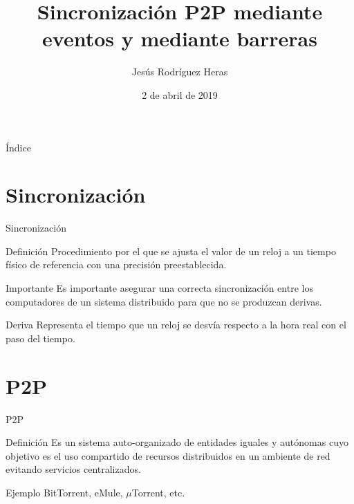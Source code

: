 \documentclass{beamer}
\title{Sincronización P2P mediante eventos y mediante barreras}
\author{Jesús Rodríguez Heras}
\date{2 de abril de 2019}
\begin{document}
\begin{frame}
  \titlepage
\end{frame}

\begin{frame}{Índice}
  \tableofcontents
\end{frame}


\section{Sincronización}
\begin{frame}{Sincronización}
	\begin{block}{Definición}
		Procedimiento por el que se ajusta el valor de un reloj a un tiempo físico de referencia con una precisión preestablecida.
	\end{block}
	\begin{alertblock}{Importante}
		Es importante asegurar una correcta sincronización entre los computadores de un sistema distribuido para que no se produzcan derivas.
	\end{alertblock}
	\begin{block}{Deriva}
		Representa el tiempo que un reloj se desvía respecto a la hora real con el paso del tiempo.
	\end{block}
\end{frame}

\section{P2P}
\begin{frame}{P2P}
	\begin{block}{Definición}
		Es un sistema auto-organizado de entidades iguales y autónomas cuyo objetivo es el uso compartido de recursos distribuidos en un ambiente de red evitando servicios centralizados.
	\end{block}
	\begin{exampleblock}{Ejemplo}
		BitTorrent, eMule, $\mu$Torrent, etc.
	\end{exampleblock}
\end{frame}
\end{document}
